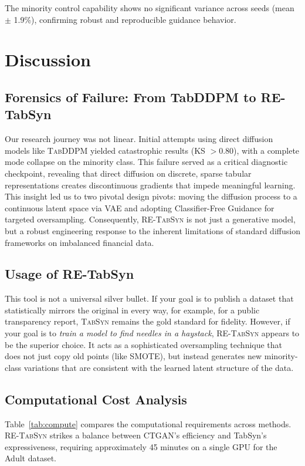 \documentclass[conference]{IEEEtran}
\newcommand{\retabsyn}{\textsc{RE-TabSyn}}
\newcommand{\tabsyn}{\textsc{TabSyn}}
\newcommand{\tabddpm}{\textsc{TabDDPM}}
\begin{document}
The minority control capability shows no significant variance across seeds (mean $\pm$ 1.9\%), confirming robust and reproducible guidance behavior.

\section{Discussion}

\subsection{Forensics of Failure: From TabDDPM to RE-TabSyn}
Our research journey was not linear. Initial attempts using direct diffusion models like \tabddpm{} yielded catastrophic results (KS $> 0.80$), with a complete mode collapse on the minority class. This failure served as a critical diagnostic checkpoint, revealing that direct diffusion on discrete, sparse tabular representations creates discontinuous gradients that impede meaningful learning. This insight led us to two pivotal design pivots: moving the diffusion process to a continuous latent space via VAE and adopting Classifier-Free Guidance for targeted oversampling. Consequently, \retabsyn{} is not just a generative model, but a robust engineering response to the inherent limitations of standard diffusion frameworks on imbalanced financial data.

\subsection{Usage of RE-TabSyn}
This tool is not a universal silver bullet. If your goal is to publish a dataset that statistically mirrors the original in every way, for example, for a public transparency report, \tabsyn{} remains the gold standard for fidelity. However, if your goal is to \textit{train a model to find needles in a haystack}, \retabsyn{} appears to be the superior choice. It acts as a sophisticated oversampling technique that does not just copy old points (like SMOTE), but instead generates new minority-class variations that are consistent with the learned latent structure of the data.

\subsection{Computational Cost Analysis}
Table~\ref{tab:compute} compares the computational requirements across methods. \retabsyn{} strikes a balance between CTGAN's efficiency and TabSyn's expressiveness, requiring approximately 45 minutes on a single GPU for the Adult dataset.
\end{document}
